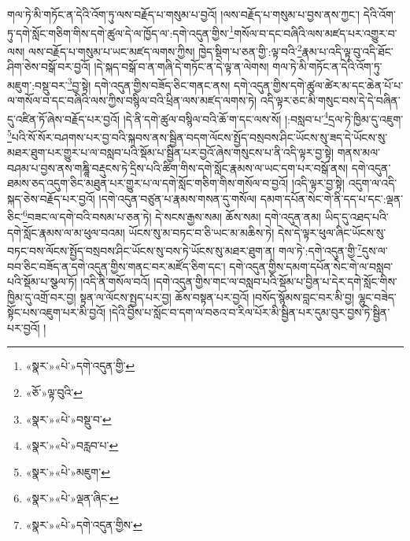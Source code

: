 གལ་ཏེ་མི་གཏོང་ན་དེའི་འོག་ཏུ་ལས་བརྗོད་པ་གསུམ་པ་བྱའོ། །ལས་བརྗོད་པ་གསུམ་པ་བྱས་ནས་ཀྱང་། དེའི་འོག་ཏུ་དགེ་སློང་གཅིག་གིས་དགེ་ཚུལ་དེ་ལ་ཁྱོད་ལ་:དགེ་འདུན་གྱིས་\footnote{«སྣར་»«པེ་»དགེ་འདུན་གྱི་}གསོལ་བ་དང་བཞིའི་ལས་མཛད་པར་འགྱུར་བ་ལས། ལས་བརྗོད་པ་གསུམ་པ་ཡང་མཛད་ལགས་ཀྱིས། ཁྱེད་སྡིག་པ་ཅན་གྱི་:ལྟ་བའི་\footnote{«ཅོ་»ལྟ་བུའི་}རྣམ་པ་འདི་ལྟ་བུ་འདི་ཐོང་ཤིག་ཅེས་བསྒོ་བར་བྱའོ། །དེ་སྐད་བསྒོ་བ་ན་གཞི་དེ་གཏོང་ན་དེ་ལྟ་ན་ལེགས། གལ་ཏེ་མི་གཏོང་ན་དེའི་འོག་ཏུ་མཇུག་:བསྡུ་བར་\footnote{«སྣར་»«པེ་»བསྡུ་བ་}བྱ་སྟེ། དགེ་འདུན་གྱིས་བཟོད་ཅིང་གནང་ནས། དགེ་འདུན་གྱིས་དགེ་ཚུལ་ཚེར་མ་དང་ཆེན་པོ་པ་ལ་གསོལ་བ་དང་བཞིའི་ལས་ཀྱིས་བསྙིལ་བའི་ཕྲིན་ལས་མཛད་ལགས་ཏེ། འདི་ལྟར་ཅང་མི་གསུང་བས་དེ་དེ་བཞིན་དུ་འཛིན་ཏོ་ཞེས་བརྗོད་པར་བྱའོ། །དེ་ནི་དགེ་ཚུལ་བསྙིལ་བའི་ཆོ་ག་དང་ལས་སོ། །:བསླབ་པ་\footnote{«སྣར་»«པེ་»བརླབ་པ་}དྲལ་ཏེ་ཁྱིམ་དུ་འཇུག་\footnote{«སྣར་»«པེ་»མཇུག་}པའི་སོ་སོར་བཤགས་པར་བྱ་བའི་སྐབས་ནས་སྦྱིན་བདག་ལོངས་སྤྱོད་བསྲབས་ཤིང་ཡོངས་སུ་ཟད་དེ་ཡོངས་སུ་མཐར་ཐུག་པར་གྱུར་པ་ལ་བསླབ་པའི་སྡོམ་པ་སྦྱིན་པར་བྱའོ་ཞེས་གསུངས་པ་ནི་འདི་ལྟར་བྱ་སྟེ། གནས་མལ་བཤམ་པ་བྱས་ནས་གཎྜཱི་བརྡུངས་ཏེ་དྲིས་པའི་ཚིག་གིས་དགེ་སློང་རྣམས་ལ་ཡང་དག་པར་བསྒོ་ནས། དགེ་འདུན་ཐམས་ཅད་འདུག་ཅིང་མཐུན་པར་གྱུར་པ་ལ་དགེ་སློང་གཅིག་གིས་གསོལ་བ་བྱའོ། །འདི་ལྟར་བྱ་སྟེ། འདུག་ལ་འདི་སྐད་ཅེས་བརྗོད་པར་བྱའོ། །དགེ་འདུན་བཙུན་པ་རྣམས་གསན་དུ་གསོལ། དམག་དཔོན་སེང་གེ་ནི་དད་པ་དང་:ལྡན་ཅིང་\footnote{«སྣར་»«པེ་»ལྡན་ཞིང་}བཟང་ལ་དགེ་བའི་བསམ་པ་ཅན་ཏེ། དེ་སངས་རྒྱས་སམ། ཆོས་སམ། དགེ་འདུན་ནམ། ཡིད་དུ་འཐད་པའི་དགེ་སློང་རྣམས་ལ་མ་ཕུལ་བའམ། ཡོངས་སུ་མ་བཏང་བ་ཅི་ཡང་མ་མཆིས་ཏེ། དེས་དེ་ལྟར་ཕུལ་ཞིང་ཡོངས་སུ་བཏང་བས་ལོངས་སྤྱོད་བསྲབས་ཤིང་ཡོངས་སུ་བས་ཏེ་ཡོངས་སུ་མཐར་ཐུག་ན། གལ་ཏེ་:དགེ་འདུན་གྱི་\footnote{«སྣར་»«པེ་»དགེ་འདུན་གྱིས་}དུས་ལ་བབ་ཅིང་བཟོད་ན་དགེ་འདུན་གྱིས་གནང་བར་མཛོད་ཅིག་དང་། དགེ་འདུན་གྱིས་དམག་དཔོན་སེང་གེ་ལ་བསླབ་པའི་སྡོམ་པ་སྩལ་ཏོ། །འདི་ནི་གསོལ་བའོ། །དགེ་འདུན་གྱིས་གང་ལ་བསླབ་པའི་སྡོམ་པ་བྱིན་པ་དེར་དགེ་སློང་གིས་ཁྱིམ་དུ་འགྲོ་བར་བྱ། སྟན་ལ་ལོངས་སྤྱད་པར་བྱ། ཆོས་བསྟན་པར་བྱའོ། །བསོད་སྙོམས་བླང་བར་མི་བྱ། ལྷུང་བཟེད་སྟོང་པས་འཇུག་པར་མི་བྱའོ། །དེའི་བྱིས་པ་སློང་བ་དག་ལ་བཅའ་བ་རིལ་པོར་མི་སྦྱིན་པར་དུམ་བུར་བྱས་ཏེ་སྦྱིན་པར་བྱའོ། །
